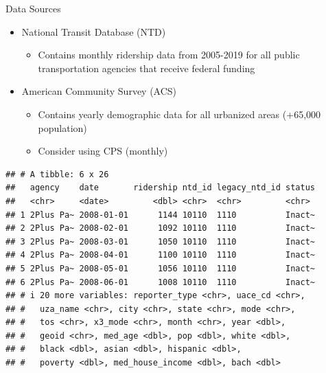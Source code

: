 \documentclass[
  ignorenonframetext,
]{beamer}
\providecommand{\tightlist}{%
  \setlength{\itemsep}{0pt}\setlength{\parskip}{0pt}}
\begin{document}
\begin{frame}[fragile]{Data Sources}
\protect\hypertarget{data-sources}{}
\begin{itemize}
\tightlist
\item
  National Transit Database (NTD)

  \begin{itemize}
  \tightlist
  \item
    Contains monthly ridership data from 2005-2019 for all public
    transportation agencies that receive federal funding
  \end{itemize}
\item
  American Community Survey (ACS)

  \begin{itemize}
  \tightlist
  \item
    Contains yearly demographic data for all urbanized areas (+65,000
    population)
  \item
    Consider using CPS (monthly) \tiny
  \end{itemize}
\end{itemize}

\begin{verbatim}
## # A tibble: 6 x 26
##   agency    date       ridership ntd_id legacy_ntd_id status
##   <chr>     <date>         <dbl> <chr>  <chr>         <chr> 
## 1 2Plus Pa~ 2008-01-01      1144 10110  1110          Inact~
## 2 2Plus Pa~ 2008-02-01      1092 10110  1110          Inact~
## 3 2Plus Pa~ 2008-03-01      1050 10110  1110          Inact~
## 4 2Plus Pa~ 2008-04-01      1100 10110  1110          Inact~
## 5 2Plus Pa~ 2008-05-01      1056 10110  1110          Inact~
## 6 2Plus Pa~ 2008-06-01      1008 10110  1110          Inact~
## # i 20 more variables: reporter_type <chr>, uace_cd <chr>,
## #   uza_name <chr>, city <chr>, state <chr>, mode <chr>,
## #   tos <chr>, x3_mode <chr>, month <chr>, year <dbl>,
## #   geoid <chr>, med_age <dbl>, pop <dbl>, white <dbl>,
## #   black <dbl>, asian <dbl>, hispanic <dbl>,
## #   poverty <dbl>, med_house_income <dbl>, bach <dbl>
\end{verbatim}
\end{frame}
\end{document}
